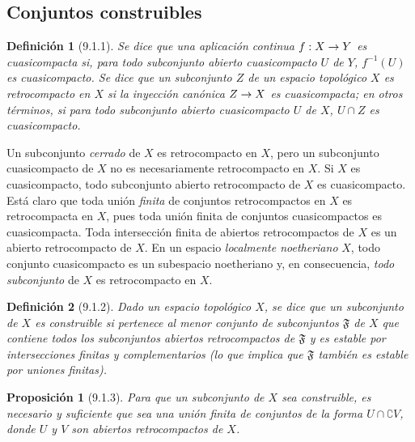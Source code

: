 \documentclass[10pt,oneside,openany]{book}
\theoremstyle{egaenv}\newtheorem*{env}{---}
\theoremstyle{egastatement}
\newtheorem*{proposition}{Proposición}
\theoremstyle{egadescription}
\newtheorem*{definition}{Definición}
\renewcommand{\to}{\mathchoice{\longrightarrow}{\rightarrow}{\rightarrow}{\rightarrow}}
\begin{document}
\subsection{Conjuntos construibles}
\label{subsection:0.9.1}
\label{subsection:0.9.1-fr}

\begin{definition}[9.1.1]
\label{0.9.1.1}
\label{0.9.1.1-fr}
Se dice que una aplicación continua $f:X\to Y$ es cuasicompacta si, para todo subconjunto abierto cuasicompacto $U$ de $Y$, $f^{-1}(U)$ es cuasicompacto.
Se dice que un subconjunto $Z$ de un espacio topológico $X$ es retrocompacto en $X$ si la inyección canónica $Z\to X$ es cuasicompacta; en otros términos, si para todo subconjunto abierto cuasicompacto $U$ de $X$, $U\cap Z$ es cuasicompacto.
\end{definition}

Un subconjunto \emph{cerrado} de $X$ es retrocompacto en $X$, pero un subconjunto cuasicompacto de $X$ no es necesariamente retrocompacto en $X$.
Si $X$ es cuasicompacto, todo subconjunto abierto retrocompacto de $X$ es cuasicompacto.
Está claro que toda unión \emph{finita} de conjuntos retrocompactos en $X$ es retrocompacta en $X$, pues toda unión finita de conjuntos cuasicompactos es cuasicompacta.
Toda intersección finita de abiertos retrocompactos de $X$ es un abierto retrocompacto de $X$.
En un espacio \emph{localmente noetheriano} $X$, todo conjunto cuasicompacto es un subespacio noetheriano y, en consecuencia, \emph{todo subconjunto} de $X$ es retrocompacto en $X$.

\begin{definition}[9.1.2]
\label{0.9.1.2}
\label{0.9.1.2-fr}
Dado un espacio topológico $X$, se dice que un subconjunto de $X$ es construible si pertenece al menor conjunto de subconjuntos $\mathfrak{F}$ de $X$ que contiene todos los subconjuntos abiertos retrocompactos de $\mathfrak{F}$ y es estable por intersecciones finitas y complementarios \textup{(lo que implica que $\mathfrak{F}$ también es} estable por uniones finitas\textup{)}.
\end{definition}

\begin{proposition}[9.1.3]
\label{0.9.1.3}
\label{0.9.1.3-fr}
Para que un subconjunto de $X$ sea construible, es necesario y suficiente que sea una unión finita de conjuntos de la forma $U\cap\complement{V}$, donde $U$ y $V$ son abiertos retrocompactos de $X$.
\end{proposition}
\end{document}
